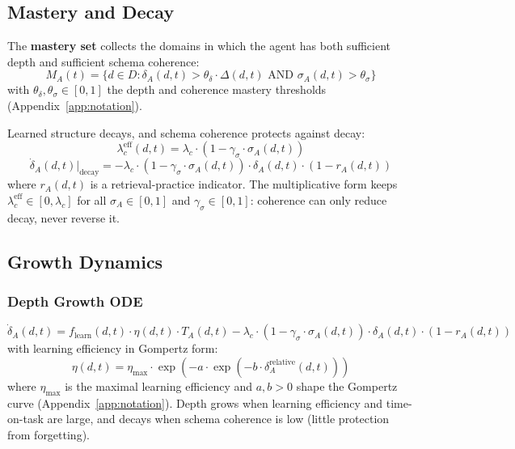 \documentclass{article}
\theoremstyle{definition}
\begin{document}
\subsection{Mastery and Decay}\label{sec:mastery-set}

The \textbf{mastery set} collects the domains in which the agent has
both sufficient depth and sufficient schema coherence:
\begin{equation}\label{eq:mastery-set}
M_A(t) = \{d \in D : \delta_A(d,t) > \theta_{\delta} \cdot \Delta(d,t) \text{ AND } \sigma_A(d,t) > \theta_{\sigma}\}
\end{equation}
with $\theta_{\delta}, \theta_{\sigma} \in [0,1]$ the depth and
coherence mastery thresholds (Appendix~\ref{app:notation}).

Learned structure decays, and schema coherence protects against decay:
\begin{equation}\label{eq:effective-decay}
\lambda_c^{\text{eff}}(d,t) = \lambda_c \cdot (1 - \gamma_\sigma \cdot \sigma_A(d,t))
\end{equation}
\begin{equation}\label{eq:depth-decay}
\dot{\delta}_A(d,t)\big|_{\text{decay}} = -\lambda_c \cdot (1 - \gamma_\sigma \cdot \sigma_A(d,t)) \cdot \delta_A(d,t) \cdot (1 - r_A(d,t))
\end{equation}
where $r_A(d,t)$ is a retrieval-practice indicator. The multiplicative
form keeps $\lambda_c^{\text{eff}} \in [0, \lambda_c]$ for all
$\sigma_A \in [0,1]$ and $\gamma_\sigma \in [0,1]$: coherence can only
reduce decay, never reverse it.

\subsection{Growth Dynamics}\label{sec:growth}

\subsubsection{Depth Growth ODE}
\begin{equation}\label{eq:depth-ode}
\dot{\delta}_A(d,t) = f_{\text{learn}}(d,t) \cdot \eta(d,t) \cdot T_A(d,t) - \lambda_c \cdot (1 - \gamma_\sigma \cdot \sigma_A(d,t)) \cdot \delta_A(d,t) \cdot (1 - r_A(d,t))
\end{equation}
with learning efficiency in Gompertz form:
\begin{equation}\label{eq:gompertz}
\eta(d,t) = \eta_{\text{max}} \cdot \exp(-a \cdot \exp(-b \cdot \delta_A^{\text{relative}}(d,t)))
\end{equation}
where $\eta_{\max}$ is the maximal learning efficiency and
$a, b > 0$ shape the Gompertz curve (Appendix~\ref{app:notation}).
Depth grows when learning efficiency and time-on-task are large, and
decays when schema coherence is low (little protection from forgetting).
\end{document}

